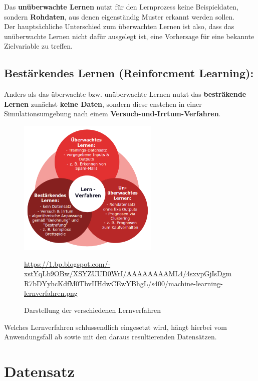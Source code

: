 	Das \textbf{unüberwachte Lernen} nutzt für den Lernprozess keine Beispieldaten, sondern \textbf{Rohdaten}, aus denen eigenständig Muster erkannt werden sollen. \\
	Der hauptsächliche Unterschied zum überwachten Lernen ist also, dass das unüberwachte Lernen nicht dafür ausgelegt ist, eine Vorhersage für eine bekannte Zielvariable zu treffen. \cite{datasolut3}
	
\subsection{Bestärkendes Lernen (Reinforcment Learning):}

	Anders als das überwachte bzw. unüberwachte Lernen nutzt das \textbf{besträkende Lernen} zunächst \textbf{keine Daten}, sondern diese enstehen in einer Simulationsumgebung nach einem \textbf{Versuch-und-Irrtum-Verfahren}. \cite{der-onliner_blogspot}
	
\begin{figure}[H]
	\centering
	\includegraphics[width=0.6\textwidth]{kapitel3/images/lernverfahren.png}
	\label{fig:machine-learning-algorithms}
	\caption{Darstellung der verschiedenen Lernverfahren}
	\vspace{0.2cm}
	\quelle\url{https://1.bp.blogspot.com/-xstYqLb9OBw/XSYZUUD0WrI/AAAAAAAAML4/4sxvpGjIsDgmR7bDYyhcKdfM0TbvIIHdwCEwYBhgL/s400/machine-learning-lernverfahren.png}
\end{figure}

Welches Lernverfahren schlussendlich eingesetzt wird, hängt hierbei vom Anwendungsfall ab sowie mit den daraus resultierenden Datensätzen.

\section{Datensatz}

